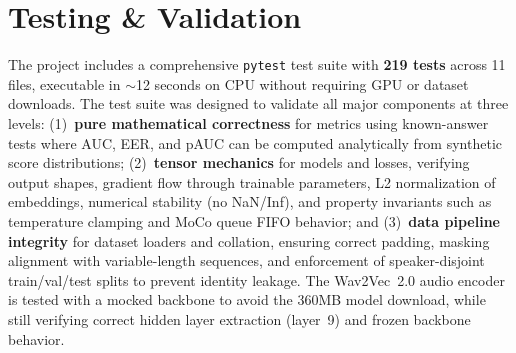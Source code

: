 \documentclass[12pt, letterpaper]{article}
\begin{document}
\section{Testing \& Validation}

The project includes a comprehensive \texttt{pytest} test suite with \textbf{219 tests} across 11 files, executable in $\sim$12 seconds on CPU without requiring GPU or dataset downloads. The test suite was designed to validate all major components at three levels: (1)~\textbf{pure mathematical correctness} for metrics using known-answer tests where AUC, EER, and pAUC can be computed analytically from synthetic score distributions; (2)~\textbf{tensor mechanics} for models and losses, verifying output shapes, gradient flow through trainable parameters, L2 normalization of embeddings, numerical stability (no NaN/Inf), and property invariants such as temperature clamping and MoCo queue FIFO behavior; and (3)~\textbf{data pipeline integrity} for dataset loaders and collation, ensuring correct padding, masking alignment with variable-length sequences, and enforcement of speaker-disjoint train/val/test splits to prevent identity leakage. The Wav2Vec~2.0 audio encoder is tested with a mocked backbone to avoid the 360MB model download, while still verifying correct hidden layer extraction (layer~9) and frozen backbone behavior.
\end{document}
